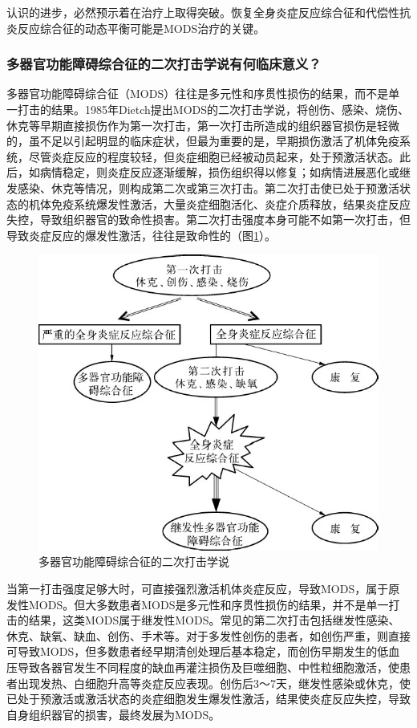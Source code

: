 认识的进步，必然预示着在治疗上取得突破。恢复全身炎症反应综合征和代偿性抗炎反应综合征的动态平衡可能是MODS治疗的关键。

\subsubsection{多器官功能障碍综合征的二次打击学说有何临床意义？}

多器官功能障碍综合征（MODS）往往是多元性和序贯性损伤的结果，而不是单一打击的结果。1985年Dietch提出MODS的二次打击学说，将创伤、感染、烧伤、休克等早期直接损伤作为第一次打击，第一次打击所造成的组织器官损伤是轻微的，虽不足以引起明显的临床症状，但最为重要的是，早期损伤激活了机体免疫系统，尽管炎症反应的程度较轻，但炎症细胞已经被动员起来，处于预激活状态。此后，如病情稳定，则炎症反应逐渐缓解，损伤组织得以修复；如病情进展恶化或继发感染、休克等情况，则构成第二次或第三次打击。第二次打击使已处于预激活状态的机体免疫系统爆发性激活，大量炎症细胞活化、炎症介质释放，结果炎症反应失控，导致组织器官的致命性损害。第二次打击强度本身可能不如第一次打击，但导致炎症反应的爆发性激活，往往是致命性的（图\ref{fig1-2}）。

\begin{figure}[!htbp]
 \centering
 \includegraphics{./images/Image00003.jpg}
 \captionsetup{justification=centering}
 \caption{多器官功能障碍综合征的二次打击学说}
 \label{fig1-2}
  \end{figure} 

当第一打击强度足够大时，可直接强烈激活机体炎症反应，导致MODS，属于原发性MODS。但大多数患者MODS是多元性和序贯性损伤的结果，并不是单一打击的结果，这类MODS属于继发性MODS。常见的第二次打击包括继发性感染、休克、缺氧、缺血、创伤、手术等。对于多发性创伤的患者，如创伤严重，则直接可导致MODS，但多数患者经早期清创处理后基本稳定，而创伤早期发生的低血压导致各器官发生不同程度的缺血再灌注损伤及巨噬细胞、中性粒细胞激活，使患者出现发热、白细胞升高等炎症反应表现。创伤后3～7天，继发性感染或休克，使已处于预激活或激活状态的炎症细胞发生爆发性激活，结果使炎症反应失控，导致自身组织器官的损害，最终发展为MODS。

